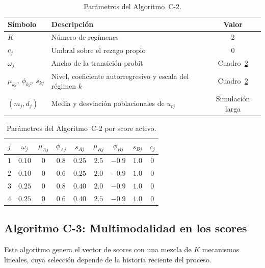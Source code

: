 \begin{table}[H]
\centering
\caption{Parámetros del Algoritmo~C-2.}
\label{tab:ane_algC2}
\begin{tabular}{llc}
\hline
Símbolo & Descripción & Valor \\
\hline
$K$                       & Número de regímenes                                    & $2$ \\
$c_j$                     & Umbral sobre el rezago propio                          & $0$ \\
$\omega_j$                     & Ancho de la transición probit                          & Cuadro~\ref{tab:ane_algC2_scores} \\
$\mu_{kj},\ \phi_{kj},\ s_{kj}$ & Nivel, coeficiente autorregresivo y escala del régimen $k$ & Cuadro~\ref{tab:ane_algC2_scores} \\
$(m_j,d_j)$               & Media y desviación poblacionales de $u_{tj}$           & Simulación larga \\
\hline
\end{tabular}
\end{table}

\begin{table}[H]
\centering
\caption{Parámetros del Algoritmo~C-2 por score activo.}
\label{tab:ane_algC2_scores}
\small\setlength{\tabcolsep}{5pt}
\begin{tabular}{lcccccccc}
\hline
$j$ & $\omega_j$ & $\mu_{Aj}$ & $\phi_{Aj}$ & $s_{Aj}$ & $\mu_{Bj}$ & $\phi_{Bj}$ & $s_{Bj}$ & $c_j$ \\
\hline
$1$ & $0.10$ & $0$ & $0.8$ & $0.25$ & $2.5$ & $-0.9$ & $1.0$ & $0$ \\
$2$ & $0.10$ & $0$ & $0.6$ & $0.25$ & $2.0$ & $-0.9$ & $1.0$ & $0$ \\
$3$ & $0.25$ & $0$ & $0.8$ & $0.40$ & $2.0$ & $-0.9$ & $1.0$ & $0$ \\
$4$ & $0.25$ & $0$ & $0.6$ & $0.40$ & $2.5$ & $-0.9$ & $1.0$ & $0$ \\
\hline
\end{tabular}
\end{table}

\subsection{Algoritmo C-3: Multimodalidad en los scores}
\label{ane_00_02_03_alg_c3}
Este algoritmo genera el vector de scores con una mezcla de $K$ mecanismos lineales, cuya selección depende de la historia reciente del proceso.\\

